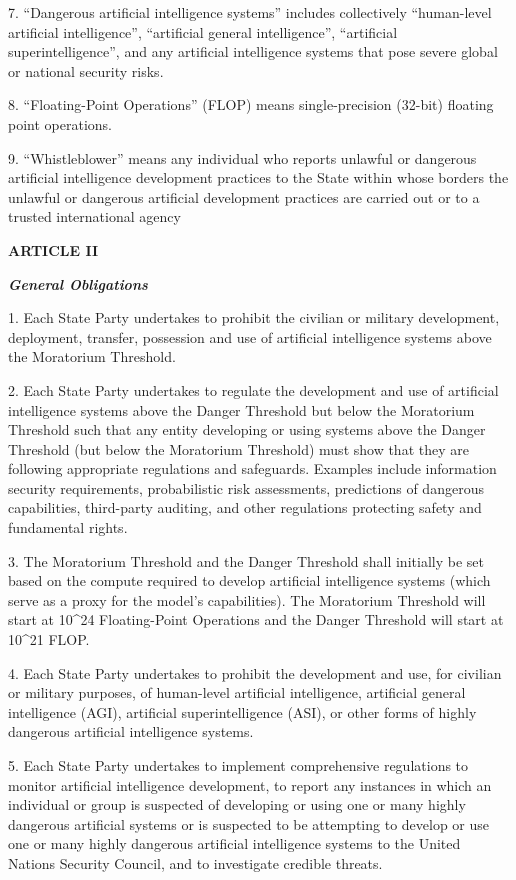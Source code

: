 \documentclass[12pt,a4paper]{article}
\begin{document}
7. “Dangerous artificial intelligence systems” includes collectively “human-level artificial intelligence”, “artificial general intelligence”, “artificial superintelligence”, and any artificial intelligence systems that pose severe global or national security risks.

8. “Floating-Point Operations” (FLOP) means single-precision (32-bit) floating point operations.

9. “Whistleblower” means any individual who reports unlawful or dangerous artificial intelligence development practices to the State within whose borders the unlawful or dangerous artificial development practices are carried out or to a trusted international agency

 \begin{center}

\textbf{{ARTICLE II}}

\textit{\textbf{General Obligations}}
\end{center}

1. Each State Party undertakes to prohibit the civilian or military development, deployment, transfer, possession and use of artificial intelligence systems above the Moratorium Threshold. 

2. Each State Party undertakes to regulate the development and use of artificial intelligence systems above the Danger Threshold but below the Moratorium Threshold such that any entity developing or using systems above the Danger Threshold (but below the Moratorium Threshold) must show that they are following appropriate regulations and safeguards. Examples include information security requirements, probabilistic risk assessments, predictions of dangerous capabilities, third-party auditing, and other regulations protecting safety and fundamental rights.

3. The Moratorium Threshold and the Danger Threshold shall initially be set based on the compute required to develop artificial intelligence systems (which serve as a proxy for the model's capabilities). The Moratorium Threshold will start at 10\^{}24 Floating-Point Operations and the Danger Threshold will start at 10\^{}21 FLOP. 

4. Each State Party undertakes to prohibit the development and use, for civilian or military purposes, of human-level artificial intelligence, artificial general intelligence (AGI), artificial superintelligence (ASI), or other forms of highly dangerous artificial intelligence systems. 

5. Each State Party undertakes to implement comprehensive regulations to monitor artificial intelligence development, to report any instances in which an individual or group is suspected of developing or using one or many highly dangerous artificial systems or is suspected to be attempting to develop or use one or many highly dangerous artificial intelligence systems to the United Nations Security Council, and to investigate credible threats.
\end{document}
